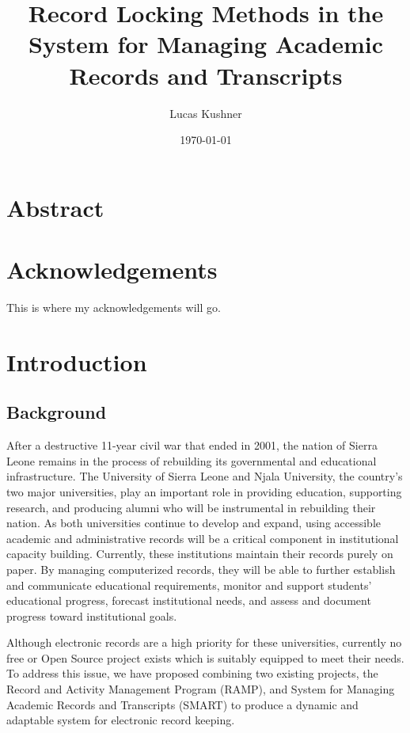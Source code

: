 \documentclass[12pt]{article}
\title{Record Locking Methods in the System for Managing Academic Records and Transcripts}
\author{Lucas Kushner}
\date{\today}
\begin{document}
\begin{titlepage}
    \maketitle
    \thispagestyle{empty}
\end{titlepage}

\newpage\null\thispagestyle{empty}\newpage

\doublespace

\section*{Abstract}

\newpage

\section*{Acknowledgements}
This is where my acknowledgements will go.

\newpage

\tableofcontents

\newpage
{}
\section{Introduction}

\subsection{Background}

After a destructive 11-year civil war that ended in 2001, the nation of Sierra Leone remains in the process of rebuilding its governmental and educational infrastructure. The University of Sierra Leone and Njala University, the country's two major universities, play an important role in providing education, supporting research, and producing alumni who will be instrumental in rebuilding their nation. As both universities continue to develop and expand, using accessible academic and administrative records will be a critical component in institutional capacity building. Currently, these institutions maintain their records purely on paper. By managing computerized records, they will be able to further establish and communicate educational requirements, monitor and support students' educational progress, forecast institutional needs, and assess and document progress toward institutional goals.

Although electronic records are a high priority for these universities, currently no free or Open Source project exists which is suitably equipped to meet their needs. To address this issue, we have proposed combining two existing projects, the Record and Activity Management Program (RAMP), and System for Managing Academic Records and Transcripts (SMART) to produce a dynamic and adaptable system for electronic record keeping.
\end{document}
